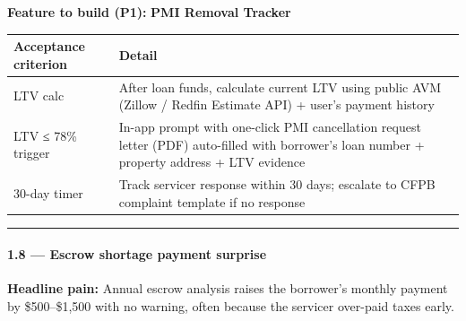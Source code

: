 \documentclass[
  10pt,
]{article}
\begin{document}
\textbf{Feature to build (P1):} \textbf{PMI Removal Tracker}

\begin{longtable}[]{@{}ll@{}}
\toprule
\begin{minipage}[b]{0.47\columnwidth}\raggedright
Acceptance criterion\strut
\end{minipage} & \begin{minipage}[b]{0.47\columnwidth}\raggedright
Detail\strut
\end{minipage}\tabularnewline
\midrule
\endhead
\begin{minipage}[t]{0.47\columnwidth}\raggedright
LTV calc\strut
\end{minipage} & \begin{minipage}[t]{0.47\columnwidth}\raggedright
After loan funds, calculate current LTV using public AVM (Zillow / Redfin Estimate API) + user's
payment history\strut
\end{minipage}\tabularnewline
\begin{minipage}[t]{0.47\columnwidth}\raggedright
LTV ≤ 78\% trigger\strut
\end{minipage} & \begin{minipage}[t]{0.47\columnwidth}\raggedright
In-app prompt with one-click PMI cancellation request letter (PDF) auto-filled with borrower's loan
number + property address + LTV evidence\strut
\end{minipage}\tabularnewline
\begin{minipage}[t]{0.47\columnwidth}\raggedright
30-day timer\strut
\end{minipage} & \begin{minipage}[t]{0.47\columnwidth}\raggedright
Track servicer response within 30 days; escalate to CFPB complaint template if no response\strut
\end{minipage}\tabularnewline
\bottomrule
\end{longtable}

\begin{center}\rule{0.5\linewidth}{0.5pt}\end{center}

\hypertarget{escrow-shortage-payment-surprise}{%
\paragraph{1.8 --- Escrow shortage payment surprise}\label{escrow-shortage-payment-surprise}}

\textbf{Headline pain:} Annual escrow analysis raises the borrower's monthly payment by
\$500--\$1,500 with no warning, often because the servicer over-paid taxes early.
\end{document}
